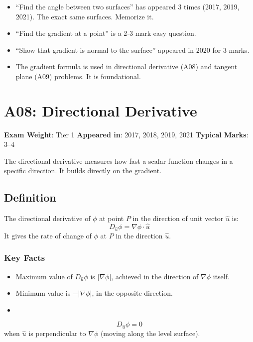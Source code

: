 \documentclass[
]{article}
\providecommand{\tightlist}{%
  \setlength{\itemsep}{0pt}\setlength{\parskip}{0pt}}
\renewenvironment{quote}
  {\begin{tcolorbox}[
     colback=calloutbg,
     colframe=calloutframe,
     colupper=callouttext,
     arc=3pt,
     boxrule=0.5pt,
     leftrule=0.5pt,
     borderline west={3pt}{0pt}{calloutaccent},
     left=8pt,
     right=8pt,
     top=6pt,
     bottom=6pt
   ]}
  {\end{tcolorbox}}
\begin{document}
\begin{itemize}
\tightlist
\item
  ``Find the angle between two surfaces'' has appeared 3 times (2017,
  2019, 2021). The exact same surfaces. Memorize it.
\item
  ``Find the gradient at a point'' is a 2-3 mark easy question.
\item
  ``Show that gradient is normal to the surface'' appeared in 2020 for 3
  marks.
\item
  The gradient formula is used in directional derivative (A08) and
  tangent plane (A09) problems. It is foundational.
\end{itemize}

\section{A08: Directional Derivative}\label{a08-directional-derivative}

\begin{quote}
\textbf{Exam Weight}: Tier 1 \textbar{} \textbf{Appeared in}: 2017,
2018, 2019, 2021 \textbar{} \textbf{Typical Marks}: 3--4
\end{quote}

The directional derivative measures how fast a scalar function changes
in a specific direction. It builds directly on the gradient.

\subsection{Definition}\label{definition-1}

The directional derivative of \(\phi\) at point \(P\) in the direction
of unit vector \(\hat{u}\) is:
\[
D_{\hat{u}}\phi = \nabla\phi \cdot \hat{u}
\]
It gives the rate of change of \(\phi\) at \(P\) in the direction
\(\hat{u}\).

\subsubsection{Key Facts}\label{key-facts}

\begin{itemize}
\tightlist
\item
  Maximum value of \(D_{\hat{u}}\phi\) is \(\lvert \nabla\phi \rvert\),
  achieved in the direction of \(\nabla\phi\) itself.
\item
  Minimum value is \(-\lvert \nabla\phi \rvert\), in the opposite
  direction.
\item
\end{itemize}
\[
D_{\hat{u}}\phi = 0
\]
when \(\hat{u}\) is perpendicular to \(\nabla\phi\) (moving along the
level surface).
\end{document}
